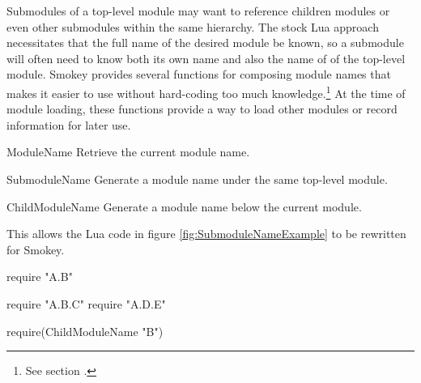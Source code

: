 Submodules of a top-level module may want to reference children modules or even
other submodules within the same hierarchy.  The stock Lua approach
necessitates that the full name of the desired module be known, so a submodule
will often need to know both its own name and also the name of of the top-level
module. Smokey provides several functions for composing module names that makes
it easier to use  without hard-coding too much
knowledge.\footnote{See section .}  At the time
of module loading, these functions provide a way to load other modules or
record information for later use.

\begin{Definition}

	\item[ModuleName] Retrieve the current module name.

	\item[SubmoduleName] Generate a module name under the same top-level
	module.

	\item[ChildModuleName] Generate a module name below the current module.

\end{Definition}

This allows the Lua code in figure \ref{fig:SubmoduleNameExample} to be
rewritten for Smokey.

\begin{lrbox}{\LeftBoxA}
\begin{NestedLuaCode}[linewidth=1in]
require "A.B"
\end{NestedLuaCode}
\end{lrbox}

\begin{lrbox}{\LeftBoxB}
\begin{NestedLuaCode}[linewidth=1in]
require "A.B.C"
require "A.D.E"
\end{NestedLuaCode}
\end{lrbox}

\begin{lrbox}{\RightBoxA}
\begin{NestedLuaCode}[linewidth=2in]
require(ChildModuleName "B")
\end{NestedLuaCode}
\end{lrbox}

